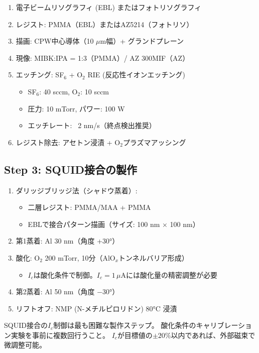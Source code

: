\documentclass[12pt,a4paper]{article}
\begin{document}
\begin{enumerate}
\item 電子ビームリソグラフィ (EBL) またはフォトリソグラフィ
\item レジスト: PMMA（EBL）またはAZ5214（フォトリソ）
\item 描画: CPW中心導体（10 $\mu$m幅）+ グランドプレーン
\item 現像: MIBK:IPA = 1:3（PMMA）/ AZ 300MIF（AZ）
\item エッチング: SF$_6$ + O$_2$ RIE (反応性イオンエッチング)
  \begin{itemize}
  \item SF$_6$: 40 sccm, O$_2$: 10 sccm
  \item 圧力: 10 mTorr, パワー: 100 W
  \item エッチレート: ~2 nm/s（終点検出推奨）
  \end{itemize}
\item レジスト除去: アセトン浸漬 + O$_2$プラズマアッシング
\end{enumerate}

\subsection{Step 3: SQUID接合の製作}

\begin{enumerate}
\item ダリッジブリッジ法（シャドウ蒸着）:
  \begin{itemize}
  \item 二層レジスト: PMMA/MAA + PMMA
  \item EBLで接合パターン描画（サイズ: 100 nm $\times$ 100 nm）
  \end{itemize}
\item 第1蒸着: Al 30 nm（角度 +30°）
\item 酸化: O$_2$ 200 mTorr, 10分（AlO$_x$トンネルバリア形成）
  \begin{itemize}
  \item $I_c$は酸化条件で制御。$I_c = 1\,\mu$Aには酸化量の精密調整が必要
  \end{itemize}
\item 第2蒸着: Al 50 nm（角度 $-30$°）
\item リフトオフ: NMP (N-メチルピロリドン) 80°C 浸漬
\end{enumerate}

\begin{warnbox}
SQUID接合の$I_c$制御は最も困難な製作ステップ。
酸化条件のキャリブレーション実験を事前に複数回行うこと。
$I_c$が目標値の$\pm 20\%$以内であれば、外部磁束で微調整可能。
\end{warnbox}
\end{document}
